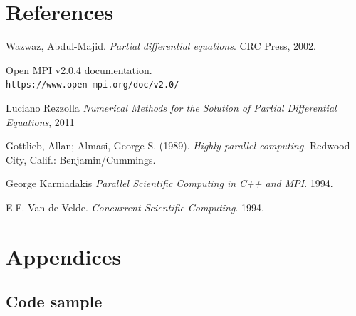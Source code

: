 \documentclass{article}
\begin{document}
    
        \newpage
        \section{References}
        \begin{thebibliography}{9}
            Wazwaz, Abdul-Majid. \textit{Partial differential equations}. CRC Press, 2002.
            
            Open MPI v2.0.4 documentation.
            \\\texttt{https://www.open-mpi.org/doc/v2.0/}
            
            Luciano Rezzolla \textit{Numerical Methods for the Solution of Partial Differential Equations}, 2011
            
            Gottlieb, Allan; Almasi, George S. (1989). \textit{Highly parallel computing}. Redwood City, Calif.: Benjamin/Cummings.
            
            George Karniadakis \textit{Parallel Scientific Computing in C++ and MPI}. 1994.

            E.F. Van de Velde. \textit{Concurrent Scientific Computing}. 1994.

    
            
        \end{thebibliography}
        \newpage
        \section{Appendices}
            \subsection{Code sample}
                
                
                
                
        
\end{document}
